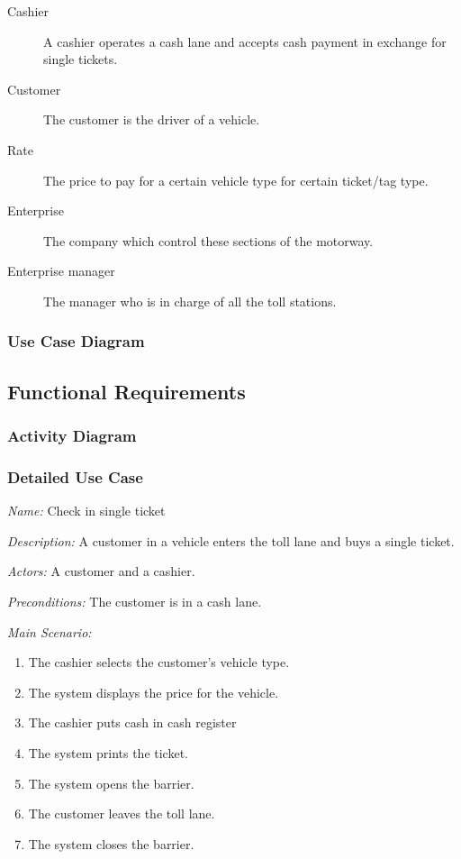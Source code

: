 \begin{description}
\item [{Cashier}] A cashier operates a cash lane and accepts cash payment
in exchange for single tickets.

\item [{Customer}] The customer is the driver of a vehicle.

\item [{Rate}] The price to pay for a certain vehicle type for certain ticket/tag type.

\item [{Enterprise}] The company which control these sections of the motorway.

\item [{Enterprise manager}] The manager who is in charge of all the toll stations.

\end{description}

\subsubsection {Use Case Diagram}

\subsection{Functional Requirements}

\subsubsection{Activity Diagram}

\subsubsection{Detailed Use Case}



\textit {Name: } Check in single ticket

\textit {Description: } A customer in a vehicle enters the toll lane and buys a single ticket.

\textit {Actors: } A customer and a cashier.

\textit {Preconditions: }  The customer is in a cash lane.

\textit{Main Scenario: }

\begin{enumerate}
	\item The cashier selects the customer's vehicle type.
	\item The system displays the price for the vehicle.
	\item The cashier puts cash in cash register
	\item The system prints the ticket.
	\item The system opens the barrier.
	\item The customer leaves the toll lane.
	\item The system closes the barrier.
\end{enumerate}

